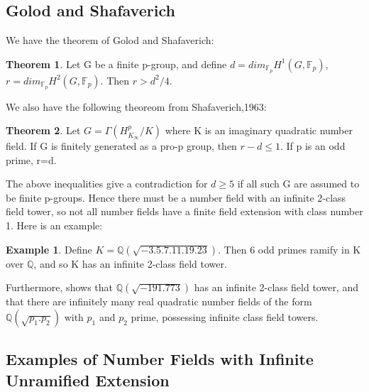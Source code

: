 \documentclass[12pt]{extarticle}
\newcommand{\<}{\langle}
\renewcommand{\>}{\rangle}
\theoremstyle{definition}
\newtheorem{theorem}{Theorem}
\newtheorem*{example}{Example}
\begin{document}
\subsection{Golod and Shafaverich}
We have the theorem of Golod and Shafaverich:\begin{theorem}
    Let G be a finite p-group, and define $d=dim_{\mathbb{F}_{p}}H^1(G,\mathbb{F}_p)$, $r=dim_{\mathbb{F}_{p}}H^2(G,\mathbb{F}_p)$. 
    Then $r>d^2/4$.
\end{theorem}
We also have the following theoreom from Shafaverich,1963:\begin{theorem}
    Let $G = \Gamma(H_{K_{\infty}}^{p}/K)$ where K is an imaginary quadratic number field. If G is finitely generated as a pro-p group, then
$r-d\leq 1 $. If p is an odd prime, r=d.
\end{theorem}
The above inequalities give a contradiction for $d \geq 5$ if all such G are assumed to be finite p-groups. Hence there must be a number field with an infinite 2-class field tower, so not all number fields have a finite field extension with class number 1. Here is an example:
\begin{example}
    Define $K=\mathbb{Q}(\sqrt{-3.5.7.11.19.23})$. Then 6 odd primes ramify in K over $\mathbb{Q}$, and so K has an infinite 2-class field tower. 
\end{example}
Furthermore, \cite{SCHO} shows that $\mathbb{Q}(\sqrt{-191.773})$ has an infinite 2-class field tower, and that there are infinitely many real quadratic number fields of the form $\mathbb{Q}(\sqrt{p_1.p_2})$ with $p_1$ and $p_2$ prime, possessing infinite class field towers. 

\subsection{Examples of Number Fields with Infinite Unramified Extension}
\end{document}
